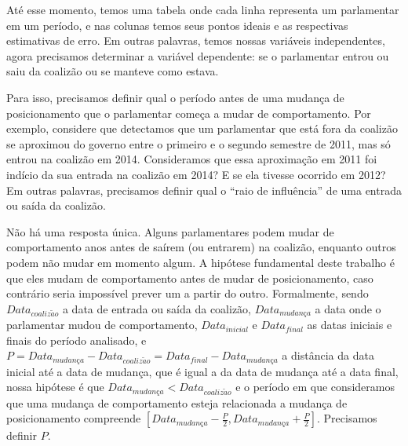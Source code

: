 \documentclass[a4paper,titlepage]{ppgi}\usepackage[]{graphicx}\usepackage[]{color}
\begin{document}
Até esse momento, temos uma tabela onde cada linha representa um parlamentar em
um período, e nas colunas temos seus pontos ideais e as respectivas estimativas
de erro. Em outras palavras, temos nossas variáveis independentes, agora
precisamos determinar a variável dependente: se o parlamentar entrou ou saiu da
coalizão ou se manteve como estava.

Para isso, precisamos definir qual o período antes de uma mudança de
posicionamento que o parlamentar começa a mudar de comportamento. Por exemplo,
considere que detectamos que um parlamentar que está fora da coalizão se
aproximou do governo entre o primeiro e o segundo semestre de 2011, mas só
entrou na coalizão em 2014. Consideramos que essa aproximação em 2011 foi
indício da sua entrada na coalizão em 2014? E se ela tivesse ocorrido em 2012?
Em outras palavras, precisamos definir qual o ``raio de influência'' de uma
entrada ou saída da coalizão.

Não há uma resposta única. Alguns parlamentares podem mudar de comportamento
anos antes de saírem (ou entrarem) na coalizão, enquanto outros podem não mudar
em momento algum. A hipótese fundamental deste trabalho é que eles mudam de
comportamento antes de mudar de posicionamento, caso contrário seria impossível
prever um a partir do outro. Formalmente, sendo $Data_{coaliz\tilde{a}o}$ a
data de entrada ou saída da coalizão, $Data_{mudan\textit{\c{c}}a}$ a data onde
o parlamentar mudou de comportamento, $Data_{inicial}$ e $Data_{final}$ as datas
iniciais e finais do período analisado, e $P = Data_{mudan\textit{\c{c}}a} -
Data_{coaliz\tilde{a}o} = Data_{final} - Data_{mudan\textit{\c{c}}a}$ a
distância da data inicial até a data de mudança, que é igual a da data de
mudança até a data final, nossa hipótese é que $Data_{mudan\textit{\c{c}}a} <
Data_{coaliz\tilde{a}o}$ e o período em que consideramos que uma mudança de
comportamento esteja relacionada a mudança de posicionamento compreende
$\left[Data_{mudan\textit{\c{c}}a} - \frac{P}{2}, Data_{mudan\textit{\c{c}}a} +
\frac{P}{2}\right]$. Precisamos definir $P$.
\end{document}
